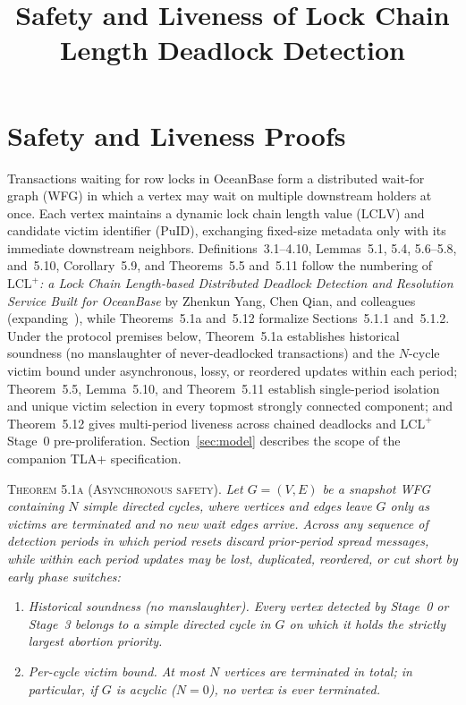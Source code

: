 \documentclass[sigconf,nonacm]{acmart}
\title{Safety and Liveness of Lock Chain Length Deadlock Detection}
\newcommand{\lclv}{\mathrm{LCLV}}
\newcommand{\puid}{\mathrm{PuID}}
\newcommand{\phead}[1]{\par\noindent\textsc{#1.}\enspace}
\begin{document}
\maketitle
{}
\pagestyle{plain}
\thispagestyle{plain}
\raggedbottom
\appendix
\section{Safety and Liveness Proofs}

Transactions waiting for row locks in OceanBase form a distributed
wait-for graph (WFG) in which a vertex may wait on multiple downstream
holders at once. Each vertex maintains a dynamic lock chain length value
(\(\lclv\)) and candidate victim identifier (\(\puid\)), exchanging
fixed-size metadata only with its immediate downstream neighbors.
Definitions~3.1--4.10, Lemmas~5.1, 5.4, 5.6--5.8, and~5.10,
Corollary~5.9, and Theorems~5.5 and~5.11 follow the numbering of
\emph{\(\text{LCL}^+\): a Lock Chain Length-based Distributed Deadlock
Detection and Resolution Service Built for OceanBase} by Zhenkun Yang,
Chen Qian, and colleagues~\cite{lclplus} (expanding~\cite{lcl}), while
Theorems~5.1a and~5.12 formalize Sections~5.1.1 and~5.1.2. Under the
protocol premises below, Theorem~5.1a establishes historical soundness
(no manslaughter of never-deadlocked transactions) and the \(N\)-cycle
victim bound under asynchronous, lossy, or reordered updates within each
period; Theorem~5.5, Lemma~5.10, and Theorem~5.11 establish
single-period isolation and unique victim selection in every topmost
strongly connected component; and Theorem~5.12 gives multi-period
liveness across chained deadlocks and \(\text{LCL}^+\) Stage~0
pre-proliferation. Section~\ref{sec:model} describes the scope of the
companion TLA+ specification.

\phead{Theorem 5.1a (Asynchronous safety)}%
\emph{Let \(G=(V,E)\) be a snapshot WFG containing \(N\) simple directed
cycles, where vertices and edges leave \(G\) only as victims are
terminated and no new wait edges arrive. Across any sequence of
detection periods in which period resets discard prior-period spread
messages, while within each period updates may be lost, duplicated,
reordered, or cut short by early phase switches:}
\begin{enumerate}
  \item[\emph{(a)}] \emph{Historical soundness (no manslaughter). Every
    vertex detected by Stage~0 or Stage~3 belongs to a simple directed
    cycle in \(G\) on which it holds the strictly largest abortion
    priority.}
  \item[\emph{(b)}] \emph{Per-cycle victim bound. At most \(N\) vertices
    are terminated in total; in particular, if \(G\) is acyclic
    (\(N=0\)), no vertex is ever terminated.}
\end{enumerate}
\end{document}
